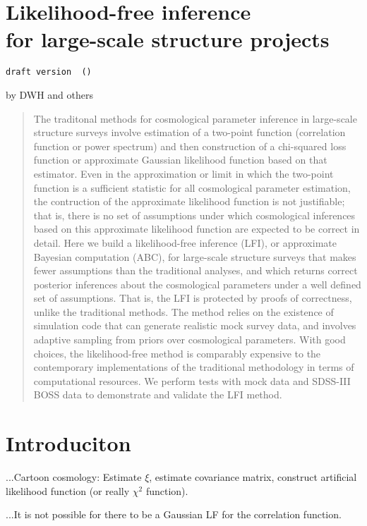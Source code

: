 \documentclass[12pt]{article}
\begin{document}
\section*{Likelihood-free inference \\ for large-scale structure projects}
\noindent
\texttt{draft version {\githash~(\gitdate)}}

\bigskip
\noindent
by DWH and others

\bigskip
\begin{abstract}
The traditonal methods for cosmological parameter inference in
large-scale structure surveys involve estimation of a two-point
function (correlation function or power spectrum) and then
construction of a chi-squared loss function or approximate Gaussian
likelihood function based on that estimator.
Even in the approximation or limit in which the two-point function is
a sufficient statistic for all cosmological parameter estimation, the
contruction of the approximate likelihood function is not justifiable;
that is, there is no set of assumptions under which cosmological
inferences based on this approximate likelihood function are expected
to be correct in detail.
Here we build a likelihood-free inference (LFI), or approximate
Bayesian computation (ABC), for large-scale structure surveys that
makes fewer assumptions than the traditional analyses, and which
returns correct posterior inferences about the cosmological parameters
under a well defined set of assumptions.
That is, the LFI is protected by proofs of correctness, unlike the
traditional methods.
The method relies on the existence of simulation code that can
generate realistic mock survey data, and involves adaptive sampling
from priors over cosmological parameters.
With good choices, the likelihood-free method is comparably expensive
to the contemporary implementations of the traditional methodology in
terms of computational resources.
We perform tests with mock data and SDSS-III BOSS data to demonstrate
and validate the LFI method.
\end{abstract}

\section{Introduciton}

...Cartoon cosmology:  Estimate $\xi$, estimate covariance matrix, construct artificial likelihood function (or really $\chi^2$ function).

...It is not possible for there to be a Gaussian LF for the correlation function.
\end{document}
